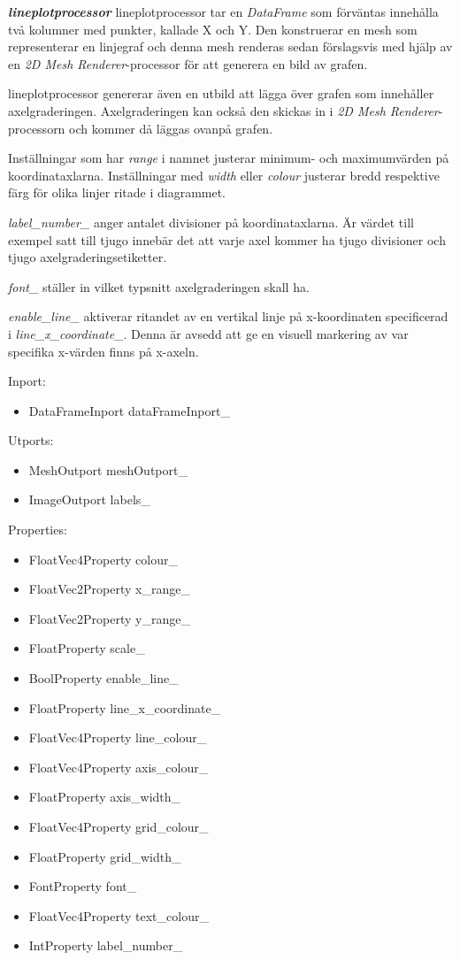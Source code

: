 \documentclass[a4paper,12pt]{article}
\begin{document}
\textbf{\textit{lineplotprocessor}}\newline
lineplotprocessor tar en \emph{DataFrame} som förväntas innehålla två
kolumner med punkter, kallade X och Y. Den konstruerar en mesh som
representerar en linjegraf och denna mesh renderas sedan förslagsvis
med hjälp av en \emph{2D Mesh Renderer}-processor för att generera en
bild av grafen.

lineplotprocessor genererar även en utbild att lägga över grafen som
innehåller axelgraderingen. Axelgraderingen kan också den skickas in i
\emph{2D Mesh Renderer}-processorn och kommer då läggas ovanpå grafen.

Inställningar som har \emph{range} i namnet justerar minimum- och
maximumvärden på koordinataxlarna. Inställningar med \emph{width}
eller \emph{colour} justerar bredd respektive färg för olika linjer
ritade i diagrammet.

\emph{label\_number\_} anger antalet divisioner på koordinataxlarna. Är
värdet till exempel satt till tjugo innebär det att varje axel kommer
ha tjugo divisioner och tjugo axelgraderingsetiketter.

\emph{font\_} ställer in vilket typsnitt axelgraderingen skall ha.

\emph{enable\_line\_} aktiverar ritandet av en vertikal linje på
x-koordinaten specificerad i \emph{line\_x\_coordinate\_}. Denna är
avsedd att ge en visuell markering av var specifika x-värden finns på
x-axeln.

Inport:
\begin{itemize}
    \item DataFrameInport dataFrameInport\_
\end{itemize}

Utports:
\begin{itemize}
    \item MeshOutport meshOutport\_
    \item ImageOutport labels\_
\end{itemize}

Properties:
\begin{itemize}
    \item FloatVec4Property colour\_
    \item FloatVec2Property x\_range\_
    \item FloatVec2Property y\_range\_
    \item FloatProperty scale\_
    \item BoolProperty enable\_line\_
    \item FloatProperty line\_x\_coordinate\_
    \item FloatVec4Property line\_colour\_
    \item FloatVec4Property axis\_colour\_
    \item FloatProperty axis\_width\_
    \item FloatVec4Property grid\_colour\_
    \item FloatProperty grid\_width\_
    \item FontProperty font\_
    \item FloatVec4Property text\_colour\_
    \item IntProperty label\_number\_
\end{itemize}
\end{document}
